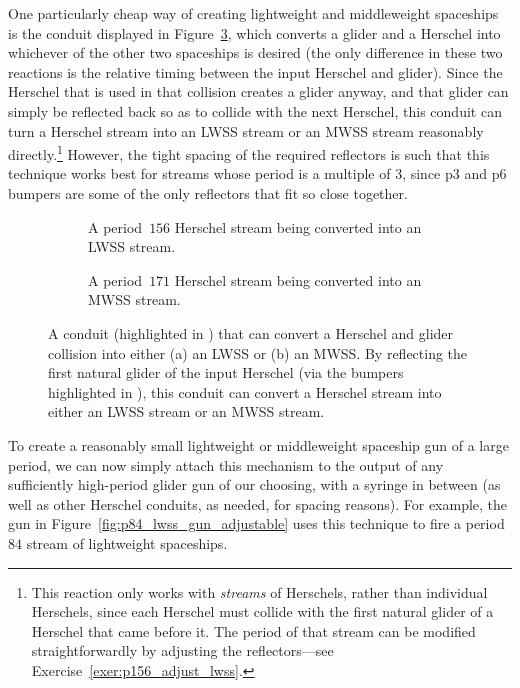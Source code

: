 One particularly cheap way of creating lightweight and middleweight spaceships is the conduit displayed in Figure~\ref{fig:H_plus_G_to_WSS}, which converts a glider and a Herschel into whichever of the other two spaceships is desired (the only difference in these two reactions is the relative timing between the input Herschel and glider). Since the Herschel that is used in that collision creates a glider anyway, and that glider can simply be reflected back so as to collide with the next Herschel, this conduit can turn a Herschel stream into an LWSS stream or an MWSS stream reasonably directly.\footnote{This reaction only works with \emph{streams} of Herschels, rather than individual Herschels, since each Herschel must collide with the first natural glider of a Herschel that came before it. The period of that stream can be modified straightforwardly by adjusting the reflectors---see Exercise~\ref{exer:p156_adjust_lwss}.} However, the tight spacing of the required reflectors is such that this technique works best for streams whose period is a multiple of $3$, since p$3$ and p$6$ bumpers are some of the only reflectors that fit so close together.

\begin{figure}[!htb]
	\centering
	\begin{subfigure}{0.48\textwidth}
		\centering
		\caption{A period~$156$ Herschel stream being converted into an LWSS stream.}\label{fig:p14_pieces_lwss}
	\end{subfigure} \hfill \begin{subfigure}{0.49\textwidth}
		\centering
		\caption{A period~$171$ Herschel stream being converted into an MWSS stream.}\label{fig:H_G_to_MWSS}
	\end{subfigure}
	\caption{A conduit (highlighted in ) that can convert a Herschel and glider collision into either (a) an LWSS or (b) an MWSS. By reflecting the first natural glider of the input Herschel (via the bumpers highlighted in ), this conduit can convert a Herschel stream into either an LWSS stream or an MWSS stream.}\label{fig:H_plus_G_to_WSS}
\end{figure}

To create a reasonably small lightweight or middleweight spaceship gun of a large period, we can now simply attach this mechanism to the output of any sufficiently high-period glider gun of our choosing, with a syringe in between (as well as other Herschel conduits, as needed, for spacing reasons). For example, the gun in Figure~\ref{fig:p84_lwss_gun_adjustable} uses this technique to fire a period~$84$ stream of lightweight spaceships.

